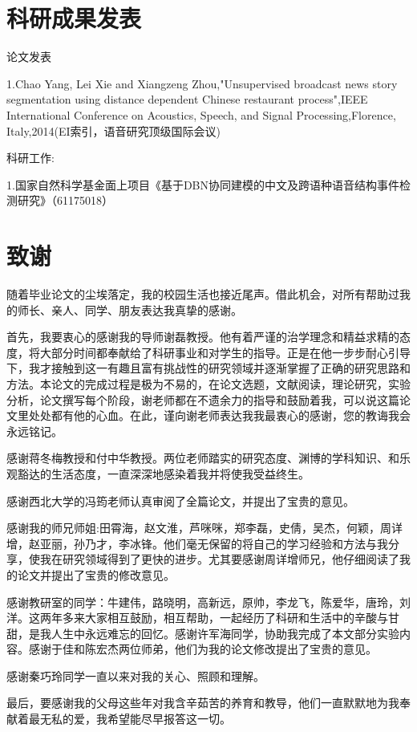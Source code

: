 
\chapter*{科研成果发表}

论文发表

1.Chao Yang, Lei Xie and Xiangzeng Zhou,"Unsupervised broadcast news story segmentation using distance dependent Chinese restaurant process",IEEE International Conference on Acoustics, Speech, and Signal Processing,Florence, Italy,2014(EI索引，语音研究顶级国际会议)

科研工作:

1.国家自然科学基金面上项目《基于DBN协同建模的中文及跨语种语音结构事件检测研究》（61175018）

\cleardoublepage

\chapter*{致谢}
随着毕业论文的尘埃落定，我的校园生活也接近尾声。借此机会，对所有帮助过我的师长、亲人、同学、朋友表达我真挚的感谢。

首先，我要衷心的感谢我的导师谢磊教授。他有着严谨的治学理念和精益求精的态度，将大部分时间都奉献给了科研事业和对学生的指导。正是在他一步步耐心引导下，我才接触到这一有趣且富有挑战性的研究领域并逐渐掌握了正确的研究思路和方法。本论文的完成过程是极为不易的，在论文选题，文献阅读，理论研究，实验分析，论文撰写每个阶段，谢老师都在不遗余力的指导和鼓励着我，可以说这篇论文里处处都有他的心血。在此，谨向谢老师表达我我最衷心的感谢，您的教诲我会永远铭记。

感谢蒋冬梅教授和付中华教授。两位老师踏实的研究态度、渊博的学科知识、和乐观豁达的生活态度，一直深深地感染着我并将使我受益终生。

感谢西北大学的冯筠老师认真审阅了全篇论文，并提出了宝贵的意见。

感谢我的师兄师姐:田霄海，赵文淮，芦咪咪，郑李磊，史倩，吴杰，何颖，周详增，赵亚丽，孙乃才，李冰锋。他们毫无保留的将自己的学习经验和方法与我分享，使我在研究领域得到了更快的进步。尤其要感谢周详增师兄，他仔细阅读了我的论文并提出了宝贵的修改意见。

感谢教研室的同学：牛建伟，路晓明，高新远，原帅，李龙飞，陈爱华，唐玲，刘洋。这两年多来大家相互鼓励，相互帮助，一起经历了科研和生活中的辛酸与甘甜，是我人生中永远难忘的回忆。感谢许军海同学，协助我完成了本文部分实验内容。感谢于佳和陈宏杰两位师弟，他们为我的论文修改提出了宝贵的意见。

感谢秦巧玲同学一直以来对我的关心、照顾和理解。

最后，要感谢我的父母这些年对我含辛茹苦的养育和教导，他们一直默默地为我奉献着最无私的爱，我希望能尽早报答这一切。
\cleardoublepage
{}